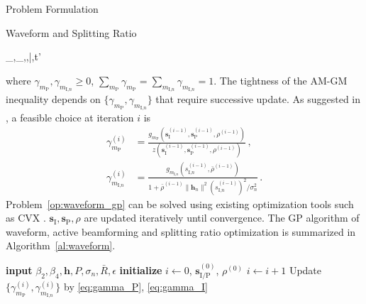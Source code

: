 \documentclass[journal]{IEEEtran}
\begin{document}
\begin{section}{Problem Formulation}
\begin{subsection}{Waveform and Splitting Ratio}
			\begin{mini!}
				{_{},_,\rho,\bar{\rho},t'}{}{\label{op:waveform_gp}}{}
			\end{mini!}
			where $\gamma_{m_\text{P}},\gamma_{m_{\text{I,}n}} \ge 0$, $\sum_{m_\text{P}}\gamma_{m_\text{P}}=\sum_{m_{\text{I,}n}}\gamma_{m_{\text{I,}n}}=1$. The tightness of the AM-GM inequality depends on $\{\gamma_{m_\text{P}},\gamma_{m_{\text{I,}n}}\}$ that require successive update. As suggested in \cite{Clerckx2018b}, a feasible choice at iteration $i$ is
			\begin{align}
				\gamma_{m_\text{P}}^{(i)} & = \frac{g_{m_\text{P}}(\boldsymbol{s}_{\text{I}}^{(i-1)},\boldsymbol{s}_\text{P}^{(i-1)},\rho^{(i-1)})}{z(\boldsymbol{s}_{\text{I}}^{(i-1)},\boldsymbol{s}_\text{P}^{(i-1)},\rho^{(i-1)})}\label{eq:gamma_P}\,,\\
				\gamma_{m_{\text{I,}n}}^{(i)} & = \frac{g_{m_{\text{I,}n}}(s_{\text{I,}n}^{(i-1)},\bar{\rho}^{(i-1)})}{1+{\bar{\rho}^{(i-1)}\lVert{\boldsymbol{h}_n}\rVert^2 (s_{\text{I,}n}^{(i-1)})^2}\big/{\sigma_n^2}}\,.\label{eq:gamma_I}
			\end{align}
			Problem~\eqref{op:waveform_gp} can be solved using existing optimization tools such as CVX \cite{Grant2013}. $\boldsymbol{s}_{\text{I}},\boldsymbol{s}_\text{P},\rho$ are updated iteratively until convergence. The GP algorithm of waveform, active beamforming and splitting ratio optimization is summarized in Algorithm~\ref{al:waveform}.
			\begin{algorithm}[!t]
				\caption{GP: Waveform, Active Beamforming and Splitting Ratio.}
				\label{al:waveform}
				\begin{algorithmic}[1]
					\State \textbf{input} $\beta_2,\beta_4,\boldsymbol{h},P,\sigma_n,\bar{R},\epsilon$
					\State \textbf{initialize} $i \gets 0$, $\boldsymbol{s}_{\text{I/P}}^{(0)}$, $\rho^{(0)}$
					\Repeat
						\State $i \gets i + 1$
						\State Update $\{\gamma_{m_\text{P}}^{(i)},\gamma_{m_{\text{I,}n}}^{(i)}\}$ by \eqref{eq:gamma_P}, \eqref{eq:gamma_I}

\end{algorithmic}
\end{algorithm}
\end{subsection}
\end{section}
\end{document}
